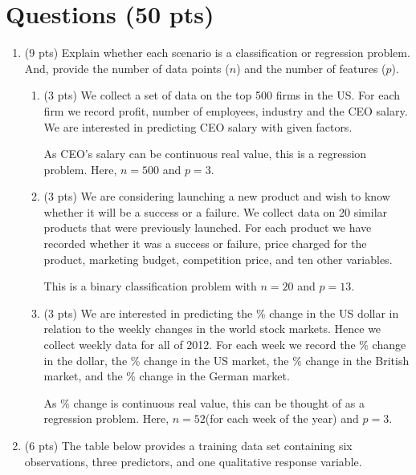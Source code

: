 \documentclass[a4paper]{article}
\theoremstyle{definition}
\newenvironment{soln}{
    \leavevmode\color{blue}\ignorespaces
}{}
\begin{document}
\section{Questions (50 pts)}
\begin{enumerate}
\item (9 pts) Explain whether each scenario is a classification or regression problem. And, provide the number of data points ($n$) and the number of features ($p$).

\begin{enumerate}
	\item (3 pts) We collect a set of data on the top 500 firms in the US. For each firm we record profit, number of employees, industry and the CEO salary. We are interested in predicting CEO salary with given factors.
	
	\begin{soln} As CEO's salary can be continuous real value, this is a regression problem. Here, $n = 500$ and $p = 3$. \end{soln}
	
	\item (3 pts) We are considering launching a new product and wish to know whether it will be a success or a failure. We collect data on 20 similar products that were previously launched. For each product we have recorded whether it was a success or failure, price charged for the product, marketing budget, competition price, and ten other variables.
	
	\begin{soln} This is a binary classification problem with $n = 20$ and $p = 13$. \end{soln}
	
	\item (3 pts) We are interested in predicting the \% change in the US dollar in relation to the weekly changes in the world stock markets. Hence we collect weekly data for all of 2012. For each week we record the \% change in the dollar, the \% change in the US market, the \% change in the British market, and the \% change in the German market.
	
	\begin{soln}  As \% change is continuous real value, this can be thought of as a regression problem. Here, $n = 52$(for each week of the year) and $p = 3$. \end{soln}
	
\end{enumerate}

\item (6 pts) The table below provides a training data set containing six observations, three predictors, and one qualitative response variable.


\end{enumerate}
\end{document}
